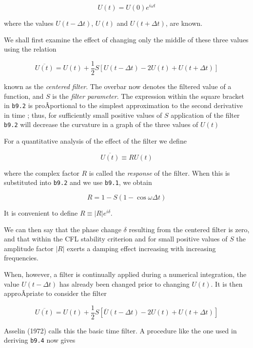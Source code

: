 {\[U\left( t \right) = U\left( 0 \right)e^{i\omega t}\]}

where the values \(U\left( t - \Delta t \right)\), \(U\left( t \right)\)
and \(U\left( t + \Delta t \right)\), are known.

We shall first examine the effect of changing only the middle of these
three values using the relation

{\[\overline{U(t)} = U(t) + \frac{1}{2}S  \left[ U\left( t - \Delta t \right) - 2U\left( t \right) + U\left( t + \Delta t \right) \right]\]}

known as the \emph{centered filter}. The overbar now denotes the
filtered value of a function, and \(S\) is the \emph{filter parameter}.
The expression within the square bracket in \texttt{b9.2} is
proÂ­portional to the simplest approximation to the second derivative in
time ; thus, for sufficiently small positive values of \(S\) application
of the filter \texttt{b9.2} will decrease the curvature in a graph of
the three values of \(U(t)\)

For a quantitative analysis of the effect of the filter we define

{\[\overline{U(t)} \equiv R U(t)\]}

where the complex factor \(R\) is called the \emph{response} of the
filter. When this is substituted into \texttt{b9.2} and we use
\texttt{b9.1}, we obtain

{\[R = 1 - S\left( 1 - \cos{\omega\Delta t} \right)\]}

It is convenient to define \(R \equiv \left| R \right|e^{i\delta}\).

We can then say that the phase change \(\delta\) resulting from the
centered filter is zero, and that within the CFL stability criterion and
for small positive values of \(S\) the amplitude factor
\(\left| R \right|\) exerts a damping effect increasing with increasing
frequencies.

When, however, a filter is continually applied during a numerical
integration, the value \(U\left( t - \Delta t \right)\) has already been
changed prior to changing \(U(t)\). It is then approÂ­priate to consider
the filter

{\[\overline{U(t)} = U\left( t \right) + \frac{1}{2}S \left\lbrack \overline{U}\left( t - \Delta t \right) - 2U\left( t \right) + U\left( t + \Delta t \right) \right\rbrack\]}

Asselin (1972) calls this the basic time filter. A procedure like the
one used in deriving \texttt{b9.4} now gives

